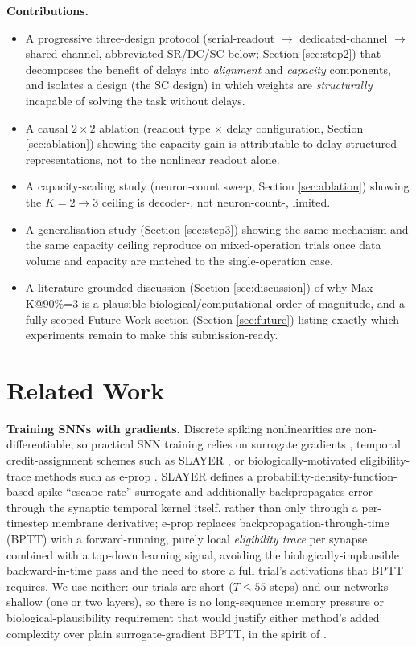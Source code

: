 \documentclass[conference]{IEEEtran}
\begin{document}
\textbf{Contributions.}
\begin{itemize}
\item A progressive three-design protocol (serial-readout $\to$ dedicated-channel $\to$
shared-channel, abbreviated SR/DC/SC below; Section
\ref{sec:step2}) that decomposes the benefit of delays into \emph{alignment} and
\emph{capacity} components, and isolates a design (the SC design) in which weights are
\emph{structurally} incapable of solving the task without delays.
\item A causal $2\times2$ ablation (readout type $\times$ delay configuration, Section
\ref{sec:ablation}) showing the capacity gain is attributable to delay-structured
representations, not to the nonlinear readout alone.
\item A capacity-scaling study (neuron-count sweep, Section \ref{sec:ablation}) showing
the $K{=}2\to3$ ceiling is decoder-, not neuron-count-, limited.
\item A generalisation study (Section \ref{sec:step3}) showing the same mechanism and the
same capacity ceiling reproduce on mixed-operation trials once data volume and capacity
are matched to the single-operation case.
\item A literature-grounded discussion (Section \ref{sec:discussion}) of why
Max K@90\%=3 is a plausible biological/computational order of magnitude, and a fully
scoped Future Work section (Section \ref{sec:future}) listing exactly which experiments
remain to make this submission-ready.
\end{itemize}

\section{Related Work}

\textbf{Training SNNs with gradients.} Discrete spiking nonlinearities are non-differentiable,
so practical SNN training relies on surrogate gradients
\cite{neftci2019surrogate}, temporal credit-assignment schemes such as SLAYER
\cite{shrestha2018slayer}, or biologically-motivated eligibility-trace methods such as
e-prop \cite{bellec2020solution}. SLAYER defines a probability-density-function-based
spike ``escape rate'' surrogate and additionally backpropagates error through the
synaptic temporal kernel itself, rather than only through a per-timestep membrane
derivative; e-prop replaces backpropagation-through-time (BPTT) with a forward-running,
purely local \emph{eligibility trace} per synapse combined with a top-down learning
signal, avoiding the biologically-implausible backward-in-time pass and the need to store
a full trial's activations that BPTT requires. We use neither: our trials are short
($T\leq55$ steps) and our networks shallow (one or two layers), so there is no long-sequence
memory pressure or biological-plausibility requirement that would justify either method's
added complexity over plain surrogate-gradient BPTT, in the spirit of
\cite{neftci2019surrogate}.
\end{document}

